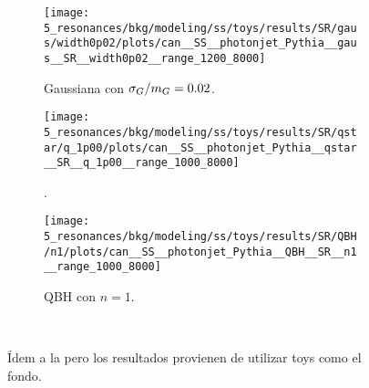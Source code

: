 \begin{figure}[ht!]
    \centering
    \begin{subfigure}[h]{0.32\linewidth}
        \centering
        \texttt{[image: 5\_resonances/bkg/modeling/ss/toys/results/SR/gaus/width0p02/plots/can\_\_SS\_\_photonjet\_Pythia\_\_gaus\_\_SR\_\_width0p02\_\_range\_1200\_8000]}
        \caption{Gaussiana con \(\sigma_G / m_{G} = 0.02\).}
    \end{subfigure}
    \hfill
    \begin{subfigure}[h]{0.32\linewidth}
        \centering
        \texttt{[image: 5\_resonances/bkg/modeling/ss/toys/results/SR/qstar/q\_1p00/plots/can\_\_SS\_\_photonjet\_Pythia\_\_qstar\_\_SR\_\_q\_1p00\_\_range\_1000\_8000]}
        \caption{\qstar.}
    \end{subfigure}
    \begin{subfigure}[h]{0.32\linewidth}
        \centering
        \texttt{[image: 5\_resonances/bkg/modeling/ss/toys/results/SR/QBH/n1/plots/can\_\_SS\_\_photonjet\_Pythia\_\_QBH\_\_SR\_\_n1\_\_range\_1000\_8000]}
        \caption{\ac{QBH} con \(n=1\).}
    \end{subfigure}\\
    \caption{Ídem a la \Fig{\ref{fig:bkg_modeling:sstest_results_asimov_SR}} pero los resultados provienen de utilizar toys como el fondo.}
    \label{fig:bkg_modeling:sstest_results_toys_SR}
\end{figure}


